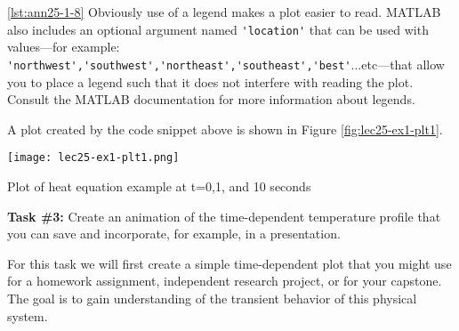 \vspace{0.15cm}

\noindent \ref{lst:ann25-1-8} Obviously use of a legend makes a plot easier to read.  MATLAB also includes an optional argument named \lstinline{'location'} that can be used with values---for example: \lstinline{'northwest','southwest','northeast','southeast','best'}...etc---that allow you to place a legend such that it does not interfere with reading the plot.  Consult the MATLAB documentation for more information about legends.

\vspace{0.15cm}

\noindent A plot created by the code snippet above is shown in Figure \ref{fig:lec25-ex1-plt1}.
\begin{marginfigure}
\texttt{[image: lec25-ex1-plt1.png]}
\caption{Plot of heat equation example at t=0,1, and 10 seconds}
\label{fig:lec25-ex1-plt1}
\end{marginfigure}

\vspace{0.25cm}

\setcounter{lstannotation}{0} %
\noindent\textbf{Task \#3: } Create an animation of the time-dependent temperature profile that you can save and incorporate, for example, in a presentation.

\vspace{0.15cm}

\noindent For this task we will first create a simple time-dependent plot that you might use for a homework assignment, independent research project, or for your capstone.  The goal is to gain understanding of the transient behavior of this physical system.

